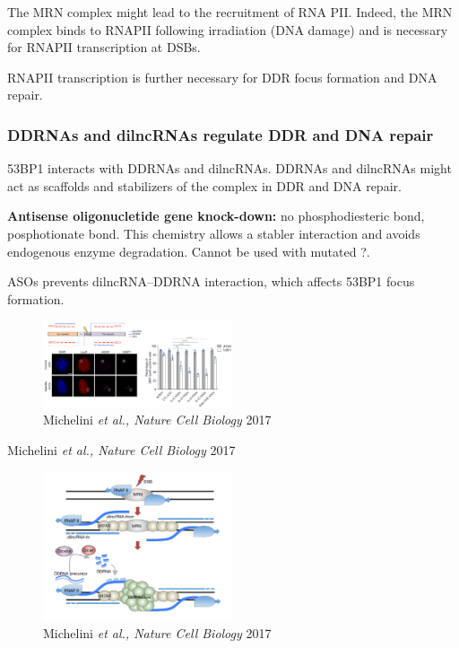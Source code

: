 The MRN complex might lead to the recruitment of RNA PII. Indeed, the MRN complex binds to RNAPII following irradiation (DNA damage) and is necessary for RNAPII transcription at DSBs.

RNAPII transcription is further necessary for DDR focus formation and DNA repair.

\hypertarget{ddrnas-and-dilncrnas-regulate-ddr-and-dna-repair}{%
\subsubsection{DDRNAs and dilncRNAs regulate DDR and DNA repair}\label{ddrnas-and-dilncrnas-regulate-ddr-and-dna-repair}}

53BP1 interacts with DDRNAs and dilncRNAs. DDRNAs and dilncRNAs might act as scaffolds and stabilizers of the complex in DDR and DNA repair.

\textbf{Antisense oligonucletide gene knock-down:} no phosphodiesteric bond, posphotionate bond. This chemistry allows a stabler interaction and avoids endogenous enzyme degradation. Cannot be used with mutated ?.

ASOs prevents dilncRNA--DDRNA interaction, which affects 53BP1 focus formation.

\begin{figure}
\centering
\includegraphics[width=0.5\textwidth]{Screen_Shot_2022-12-07_at_09-50-28.png}
\caption{Michelini \emph{et al., Nature Cell Biology} 2017}
\end{figure}

Michelini \emph{et al., Nature Cell Biology} 2017

\begin{figure}
\centering
\includegraphics[width=0.5\textwidth]{Screen_Shot_2022-12-07_at_09-51-02.png}
\caption{Michelini \emph{et al., Nature Cell Biology} 2017}
\end{figure}

